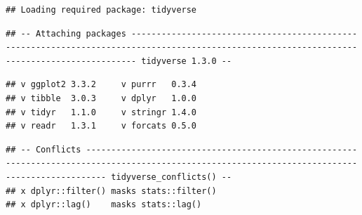 \documentclass[
]{article}
\newenvironment{Shaded}{\begin{snugshade}}{\end{snugshade}}
\newcommand{\CommentTok}[1]{\textcolor[rgb]{0.56,0.35,0.01}{\textit{#1}}}
\newcommand{\DataTypeTok}[1]{\textcolor[rgb]{0.13,0.29,0.53}{#1}}
\newcommand{\DecValTok}[1]{\textcolor[rgb]{0.00,0.00,0.81}{#1}}
\newcommand{\KeywordTok}[1]{\textcolor[rgb]{0.13,0.29,0.53}{\textbf{#1}}}
\newcommand{\NormalTok}[1]{#1}
\newcommand{\OperatorTok}[1]{\textcolor[rgb]{0.81,0.36,0.00}{\textbf{#1}}}
\newcommand{\StringTok}[1]{\textcolor[rgb]{0.31,0.60,0.02}{#1}}
\begin{document}
\begin{verbatim}
## Loading required package: tidyverse
\end{verbatim}

\begin{verbatim}
## -- Attaching packages --------------------------------------------------------------------------------------------------------------------------------------------- tidyverse 1.3.0 --
\end{verbatim}

\begin{verbatim}
## v ggplot2 3.3.2     v purrr   0.3.4
## v tibble  3.0.3     v dplyr   1.0.0
## v tidyr   1.1.0     v stringr 1.4.0
## v readr   1.3.1     v forcats 0.5.0
\end{verbatim}

\begin{verbatim}
## -- Conflicts ------------------------------------------------------------------------------------------------------------------------------------------------ tidyverse_conflicts() --
## x dplyr::filter() masks stats::filter()
## x dplyr::lag()    masks stats::lag()
\end{verbatim}

\begin{Shaded}
\end{Shaded}
\end{document}
